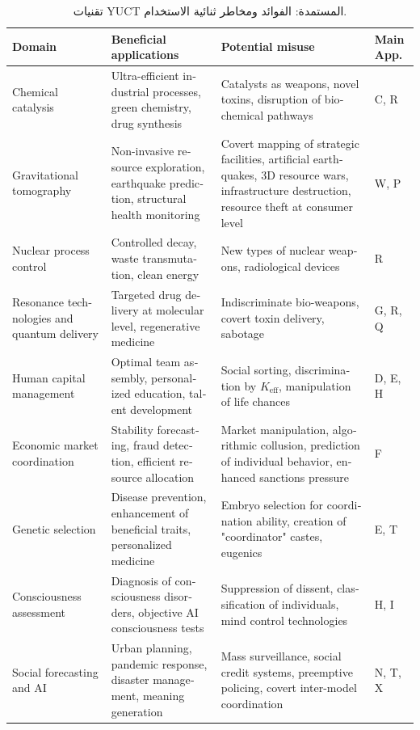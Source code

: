\documentclass[12pt,a4paper]{article}
\theoremstyle{remark}
\newcommand{\Keff}{K_{\mathrm{eff}}}
\begin{document}
	\begin{otherlanguage}{english}
		\begin{table}[htbp]
			\centering
			\caption{تقنيات YUCT المستمدة: الفوائد ومخاطر ثنائية الاستخدام.}
			\label{tab:tech-summary}
			\small
			\begin{tabularx}{\textwidth}{p{2.8cm}Xp{3.5cm}p{2.5cm}}
				\toprule
				\textbf{Domain} & \textbf{Beneficial applications} & \textbf{Potential misuse} & \textbf{Main App.} \\
				\midrule
				Chemical catalysis & Ultra-efficient industrial processes, green chemistry, drug synthesis & Catalysts as weapons, novel toxins, disruption of biochemical pathways & C, R \\
				Gravitational tomography & Non-invasive resource exploration, earthquake prediction, structural health monitoring & Covert mapping of strategic facilities, artificial earthquakes, 3D resource wars, infrastructure destruction, resource theft at consumer level & W, P \\
				Nuclear process control & Controlled decay, waste transmutation, clean energy & New types of nuclear weapons, radiological devices & R \\
				Resonance technologies and quantum delivery & Targeted drug delivery at molecular level, regenerative medicine & Indiscriminate bio-weapons, covert toxin delivery, sabotage & G, R, Q \\
				Human capital management & Optimal team assembly, personalized education, talent development & Social sorting, discrimination by \(\Keff\), manipulation of life chances & D, E, H \\
				Economic market coordination & Stability forecasting, fraud detection, efficient resource allocation & Market manipulation, algorithmic collusion, prediction of individual behavior, enhanced sanctions pressure & F \\
				Genetic selection & Disease prevention, enhancement of beneficial traits, personalized medicine & Embryo selection for coordination ability, creation of "coordinator" castes, eugenics & E, T \\
				Consciousness assessment & Diagnosis of consciousness disorders, objective AI consciousness tests & Suppression of dissent, classification of individuals, mind control technologies & H, I \\
				Social forecasting and AI & Urban planning, pandemic response, disaster management, meaning generation & Mass surveillance, social credit systems, preemptive policing, covert inter-model coordination & N, T, X \\
				\bottomrule
			\end{tabularx}
		\end{table}
	\end{otherlanguage}
	
\end{document}
